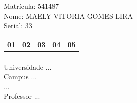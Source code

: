 \documentclass[10pt,a4paper,twocolumn]{report}
\begin{document}
Matrícula: 541487\\ Nome: MAELY VITORIA GOMES LIRA \\ Serial: 33\\
\begin{tabular}{|l|l|l|l|l|}\hline
01  &02  &03  &04  &05 \\ \hline 
 & & & & \\ \hline 
\end{tabular}
 \cleardoublepage 

\begin{flushleft}
Universidade ...\\
Campus ...\\
...\\
Professor ...\\
\end{flushleft}
\end{document}
